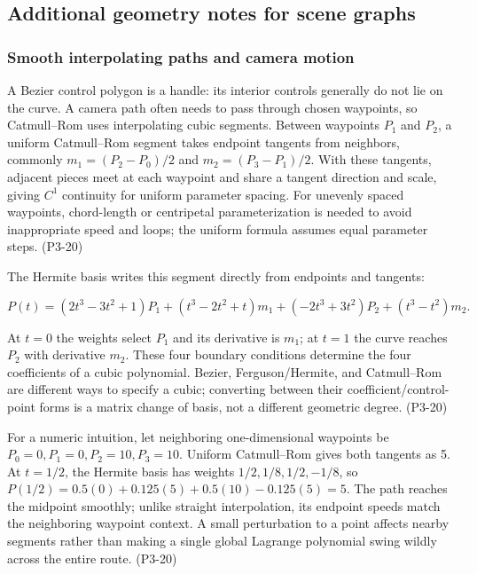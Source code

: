 \subsection{Additional geometry notes for scene graphs}\label{04-visual-computing-ii-ch029-additional-geometry-notes-for-scene-graphs}

\subsubsection{Smooth interpolating paths and camera motion}\label{04-visual-computing-ii-ch029-smooth-interpolating-paths-and-camera-motion}

A Bezier control polygon is a handle: its interior controls generally do not lie on the curve. A camera path often needs to pass through chosen waypoints, so Catmull--Rom uses interpolating cubic segments. Between waypoints \(P_1\) and \(P_2\), a uniform Catmull--Rom segment takes endpoint tangents from neighbors, commonly \(m_1=(P_2-P_0)/2\) and \(m_2=(P_3-P_1)/2\). With these tangents, adjacent pieces meet at each waypoint and share a tangent direction and scale, giving \(C^1\) continuity for uniform parameter spacing. For unevenly spaced waypoints, chord-length or centripetal parameterization is needed to avoid inappropriate speed and loops; the uniform formula assumes equal parameter steps. (P3-20)

The Hermite basis writes this segment directly from endpoints and tangents:

\[
P(t)=(2t^3-3t^2+1)P_1+(t^3-2t^2+t)m_1+(-2t^3+3t^2)P_2+(t^3-t^2)m_2.
\]

At \(t=0\) the weights select \(P_1\) and its derivative is \(m_1\); at \(t=1\) the curve reaches \(P_2\) with derivative \(m_2\). These four boundary conditions determine the four coefficients of a cubic polynomial. Bezier, Ferguson/Hermite, and Catmull--Rom are different ways to specify a cubic; converting between their coefficient/control-point forms is a matrix change of basis, not a different geometric degree. (P3-20)

For a numeric intuition, let neighboring one-dimensional waypoints be \(P_0=0,P_1=0,P_2=10,P_3=10\). Uniform Catmull--Rom gives both tangents as 5. At \(t=1/2\), the Hermite basis has weights \(1/2,1/8,1/2,-1/8\), so \(P(1/2)=0.5(0)+0.125(5)+0.5(10)-0.125(5)=5\). The path reaches the midpoint smoothly; unlike straight interpolation, its endpoint speeds match the neighboring waypoint context. A small perturbation to a point affects nearby segments rather than making a single global Lagrange polynomial swing wildly across the entire route. (P3-20)

